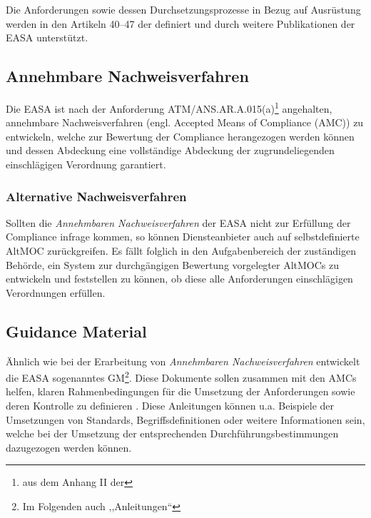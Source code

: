     Die Anforderungen sowie dessen Durchsetzungsprozesse in Bezug auf \atmans{} Ausrüstung werden in den Artikeln 40--47 der  definiert und durch weitere Publikationen der \ac{EASA} unterstützt.
        
\pagebreak
\subsection{Annehmbare Nachweisverfahren}

    Die \ac{EASA} ist nach der Anforderung \textsf{ATM/ANS.AR.A.015(a)}\footnote{aus dem Anhang II der } angehalten, annehmbare Nachweisverfahren (engl. Accepted Means of Compliance (\acs{AMC})) zu entwickeln, welche zur Bewertung der Compliance herangezogen werden können und dessen Abdeckung eine vollständige Abdeckung der zugrundeliegenden einschlägigen Verordnung garantiert. 
    \cite[Anh. II]{2017R0373}

\subsubsection{Alternative Nachweisverfahren}

    Sollten die \textit{Annehmbaren Nachweisverfahren} der \ac{EASA} nicht zur Erfüllung der Compliance infrage kommen, so können Diensteanbieter auch auf selbstdefinierte \acf{AltMOC} zurückgreifen.
    Es fällt folglich in den Aufgabenbereich der zuständigen Behörde, ein System zur durchgängigen Bewertung  vorgelegter \acp{AltMOC} zu entwickeln und feststellen zu können, ob diese alle Anforderungen einschlägigen Verordnungen erfüllen.
    \cite[Anh. II \textsf{ATM/ANS.AR.A.015(b-e)}]{2017R0373}
        
\subsection{Guidance Material}

    Ähnlich wie bei der Erarbeitung von \textit{Annehmbaren Nachweisverfahren} entwickelt die \ac{EASA} sogenanntes \acf{GM}\footnote{Im Folgenden auch ,,Anleitungen``}.
    Diese Dokumente sollen zusammen mit den \acp{AMC} helfen, klaren Rahmenbedingungen für die Umsetzung der Anforderungen sowie deren Kontrolle zu definieren
    \cite[7]{easa_2017001r}.
    Diese Anleitungen können u.a. Beispiele der Umsetzungen von Standards, Begriffsdefinitionen oder weitere Informationen sein, welche bei der Umsetzung der entsprechenden Durchführungsbestimmungen dazugezogen werden können.

